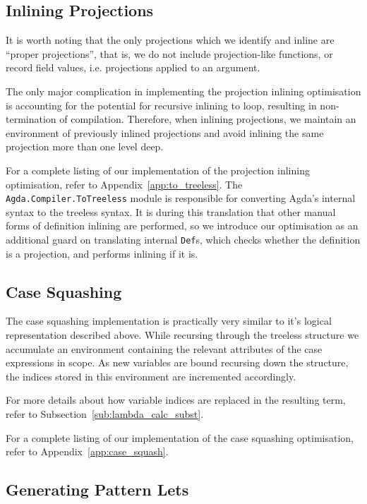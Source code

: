 \subsection{Inlining Projections}

It is worth noting that the only projections which we identify and inline are ``proper projections'', that is, we do not include projection-like functions, or record field values, i.e. projections applied to an argument.

The only major complication in implementing the projection inlining optimisation is accounting for the potential for recursive inlining to loop, resulting in non-termination of compilation. Therefore, when inlining projections, we maintain an environment of previously inlined projections and avoid inlining the same projection more than one level deep.

For a complete listing of our implementation of the projection inlining optimisation, refer to Appendix~\ref{app:to_treeless}. The \lstinline{Agda.Compiler.ToTreeless} module is responsible for converting Agda's internal syntax to the treeless syntax. It is during this translation that other manual forms of definition inlining are performed, so we introduce our optimisation as an additional guard on translating internal \lstinline{Def}s, which checks whether the definition is a projection, and performs inlining if it  is.

\subsection{Case Squashing}

The case squashing implementation is practically very similar to it's logical representation described above. While recursing through the treeless structure we accumulate an environment containing the relevant attributes of the case expressions in scope. As new variables are bound recursing down the structure, the indices stored in this environment are incremented accordingly.

For more details about how variable indices are replaced in the resulting term, refer to Subsection~\ref{sub:lambda_calc_subst}.

For a complete listing of our implementation of the case squashing optimisation, refer to Appendix~\ref{app:case_squash}.

\subsection{Generating Pattern Lets}

